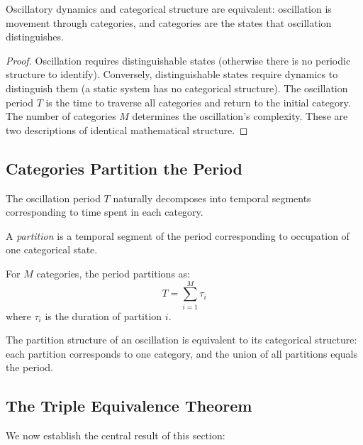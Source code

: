\begin{proposition}
\label{prop:categories}
Oscillatory dynamics and categorical structure are equivalent: oscillation is movement through categories, and categories are the states that oscillation distinguishes.
\end{proposition}

\begin{proof}
Oscillation requires distinguishable states (otherwise there is no periodic structure to identify). Conversely, distinguishable states require dynamics to distinguish them (a static system has no categorical structure). The oscillation period $T$ is the time to traverse all categories and return to the initial category. The number of categories $M$ determines the oscillation's complexity. These are two descriptions of identical mathematical structure.
\end{proof}

\subsection{Categories Partition the Period}

The oscillation period $T$ naturally decomposes into temporal segments corresponding to time spent in each category.

\begin{definition}[Partition]
\label{def:partition}
A \textit{partition} is a temporal segment of the period corresponding to occupation of one categorical state.
\end{definition}

For $M$ categories, the period partitions as:
\begin{equation}
T = \sum_{i=1}^{M} \tau_i
\end{equation}
where $\tau_i$ is the duration of partition $i$.

\begin{proposition}
\label{prop:partitions}
The partition structure of an oscillation is equivalent to its categorical structure: each partition corresponds to one category, and the union of all partitions equals the period.
\end{proposition}

\subsection{The Triple Equivalence Theorem}

We now establish the central result of this section:


